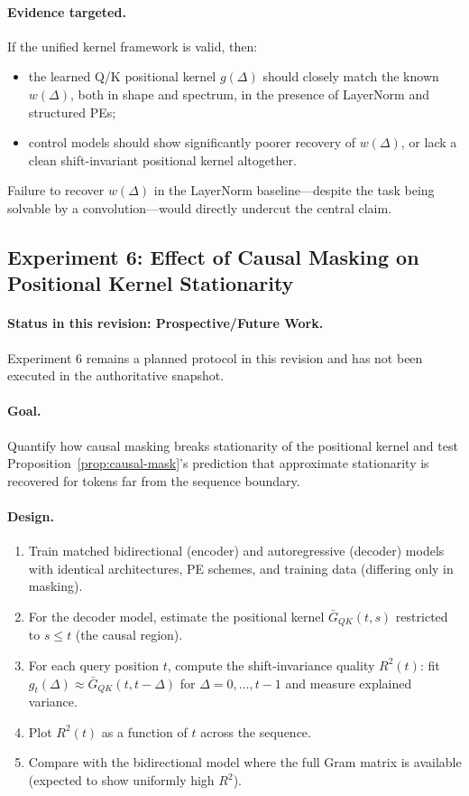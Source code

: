\documentclass[11pt]{article}
\theoremstyle{definition}
\begin{document}
\paragraph{Evidence targeted.}
If the unified kernel framework is valid, then:
\begin{itemize}
    \item the learned Q/K positional kernel \(g(\Delta)\) should closely match the known \(w(\Delta)\), both in shape and spectrum, in the presence of LayerNorm and structured PEs;
    \item control models should show significantly poorer recovery of \(w(\Delta)\), or lack a clean shift-invariant positional kernel altogether.
\end{itemize}
Failure to recover \(w(\Delta)\) in the LayerNorm baseline—despite the task being solvable by a convolution—would directly undercut the central claim.

\subsection{Experiment 6: Effect of Causal Masking on Positional Kernel Stationarity}
\label{sec:exp-causal-mask}

\paragraph{Status in this revision: \textbf{Prospective/Future Work}.}
Experiment 6 remains a planned protocol in this revision and has not been executed in the authoritative snapshot.

\paragraph{Goal.}
Quantify how causal masking breaks stationarity of the positional kernel and test Proposition~\ref{prop:causal-mask}'s prediction that approximate stationarity is recovered for tokens far from the sequence boundary.

\paragraph{Design.}
\begin{enumerate}
    \item Train matched bidirectional (encoder) and autoregressive (decoder) models with identical architectures, PE schemes, and training data (differing only in masking).
    \item For the decoder model, estimate the positional kernel $\bar{G}_{QK}(t,s)$ restricted to $s \leq t$ (the causal region).
    \item For each query position $t$, compute the shift-invariance quality $R^2(t)$: fit $g_t(\Delta) \approx \bar{G}_{QK}(t, t-\Delta)$ for $\Delta = 0, \ldots, t-1$ and measure explained variance.
    \item Plot $R^2(t)$ as a function of $t$ across the sequence.
    \item Compare with the bidirectional model where the full Gram matrix is available (expected to show uniformly high $R^2$).
\end{enumerate}
\end{document}
